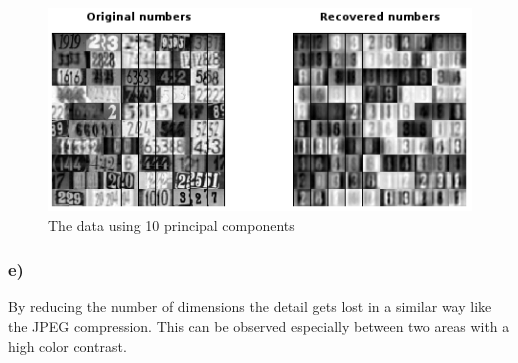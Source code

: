 \newpage

\begin{figure}[!ht]
\includegraphics[width=1\textwidth]{chapters/images/figure-3-7-d2}
\caption{The data using 10 principal components}
\end{figure}


\subsubsection{e)}

By reducing the number of dimensions the detail gets lost in a similar way like the JPEG compression. This can be observed especially between two areas with a high color contrast.